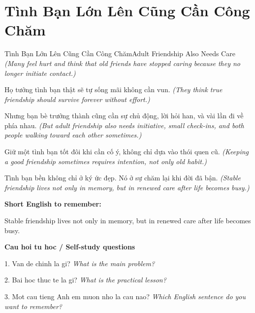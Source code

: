 \section{Tình Bạn Lớn Lên Cũng Cần Công Chăm}
\begin{truyen}{Tình Bạn Lớn Lên Cũng Cần Công Chăm}{Adult Friendship Also Needs Care}
\textit{(Many feel hurt and think that old friends have stopped caring because they no longer initiate contact.)}

Họ tưởng tình bạn thật sẽ tự sống mãi không cần vun.
\textit{(They think true friendship should survive forever without effort.)}

Nhưng bạn bè trưởng thành cũng cần sự chủ động, lời hỏi han, và vài lần đi về phía nhau.
\textit{(But adult friendship also needs initiative, small check-ins, and both people walking toward each other sometimes.)}

Giữ một tình bạn tốt đôi khi cần cố ý, không chỉ dựa vào thói quen cũ.
\textit{(Keeping a good friendship sometimes requires intention, not only old habit.)}

\end{truyen}

\begin{baihoc}
Tình bạn bền không chỉ ở ký ức đẹp. Nó ở sự chăm lại khi đời đã bận.
\textit{(Stable friendship lives not only in memory, but in renewed care after life becomes busy.)}
\end{baihoc}

\begin{ghinhoanh}
\textbf{Short English to remember:}

Stable friendship lives not only in memory, but in renewed care after life becomes busy.

\end{ghinhoanh}

\begin{tuhocnhanh}
\textbf{Cau hoi tu hoc / Self-study questions}

1. Van de chinh la gi? \textit{What is the main problem?}

2. Bai hoc thuc te la gi? \textit{What is the practical lesson?}

3. Mot cau tieng Anh em muon nho la cau nao? \textit{Which English sentence do you want to remember?}
\end{tuhocnhanh}
\ngancach

